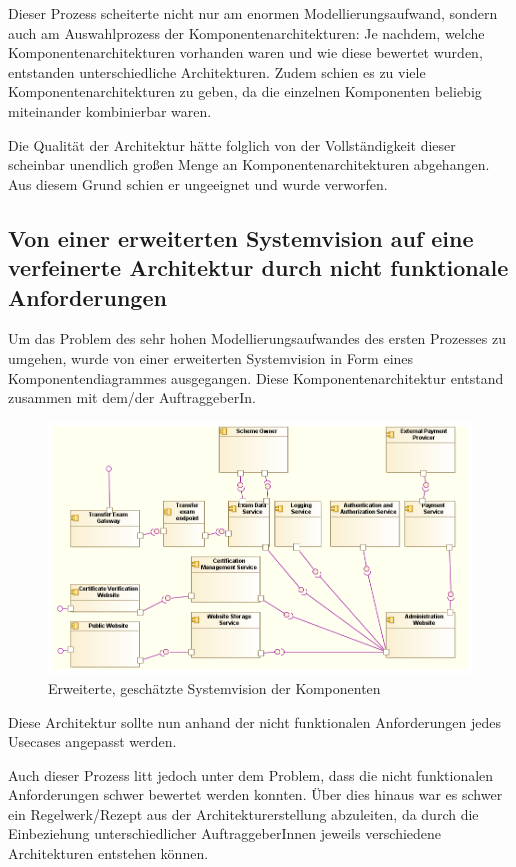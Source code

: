 Dieser Prozess scheiterte nicht nur am enormen Modellierungsaufwand, sondern auch am Auswahlprozess der Komponentenarchitekturen: Je nachdem, welche Komponentenarchitekturen vorhanden waren und wie diese bewertet wurden, entstanden unterschiedliche Architekturen. Zudem schien es zu viele Komponentenarchitekturen zu geben, da die einzelnen Komponenten beliebig miteinander kombinierbar waren.

Die Qualität der Architektur hätte folglich von der Vollständigkeit dieser scheinbar unendlich großen Menge an Komponentenarchitekturen abgehangen. Aus diesem Grund schien er ungeeignet und wurde verworfen.

\subsection{Von einer erweiterten Systemvision auf eine verfeinerte Architektur durch nicht funktionale Anforderungen}
Um das Problem des sehr hohen Modellierungsaufwandes des ersten Prozesses zu umgehen, wurde von einer erweiterten Systemvision in Form eines Komponentendiagrammes ausgegangen. Diese Komponentenarchitektur entstand zusammen mit dem/der AuftraggeberIn.

\begin{figure}[!htbp]
    \centering
    \includegraphics[scale=0.5]{uml/vision2.png}
    \caption{Erweiterte, geschätzte Systemvision der Komponenten}
\end{figure}

Diese Architektur sollte nun anhand der nicht funktionalen Anforderungen jedes Usecases angepasst werden.

Auch dieser Prozess litt jedoch unter dem Problem, dass die nicht funktionalen Anforderungen schwer bewertet werden konnten. Über dies hinaus war es schwer ein Regelwerk/Rezept aus der Architekturerstellung abzuleiten, da durch die Einbeziehung unterschiedlicher AuftraggeberInnen jeweils verschiedene Architekturen entstehen können.

